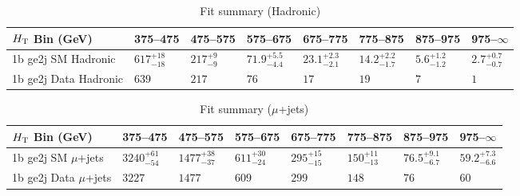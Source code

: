 \documentclass[8pt]{article}
\def\scalht{\mbox{$H_{\rm{T}}$}\xspace}
\newcommand\T{\rule{0pt}{2.6ex}}
\begin{document}
\begin{table}[ht!]
\caption{Fit summary (Hadronic)}
\label{tab:ensemble-summary}
\centering
\begin{tabular}{ llllllll }

\hline
\scalht Bin (GeV)       & 375--475                       & 475--575                       & 575--675                       & 675--775                       & 775--875                       & 875--975                       & 975--$\infty$                  \\ [1.000000ex]
\hline
1b ge2j SM Hadronic\T   & $617^{+18}_{-18}$              & $217^{+9}_{-9}$                & $71.9^{+5.5}_{-4.4}$           & $23.1^{+2.3}_{-2.1}$           & $14.2^{+2.2}_{-1.7}$           & $5.6^{+1.2}_{-1.2}$            & $2.7^{+0.7}_{-0.7}$            \\ 
1b ge2j Data Hadronic\T & $639$                          & $217$                          & $76$                           & $17$                           & $19$                           & $7$                            & $1$                            \\ 
\hline

\end{tabular}
\end{table}
\begin{table}[ht!]
\caption{Fit summary ($\mu$+jets)}
\label{tab:ensemble-summary}
\centering
\begin{tabular}{ llllllll }

\hline
\scalht Bin (GeV)       & 375--475                       & 475--575                       & 575--675                       & 675--775                       & 775--875                       & 875--975                       & 975--$\infty$                  \\ [1.000000ex]
\hline
1b ge2j SM $\mu$+jets\T & $3240^{+61}_{-54}$             & $1477^{+38}_{-37}$             & $611^{+30}_{-24}$              & $295^{+15}_{-15}$              & $150^{+11}_{-13}$              & $76.5^{+9.1}_{-6.7}$           & $59.2^{+7.3}_{-6.6}$           \\ 
1b ge2j Data $\mu$+jets\T & $3227$                         & $1477$                         & $609$                          & $299$                          & $148$                          & $76$                           & $60$                           \\ 
\hline

\end{tabular}
\end{table}
\end{document}
